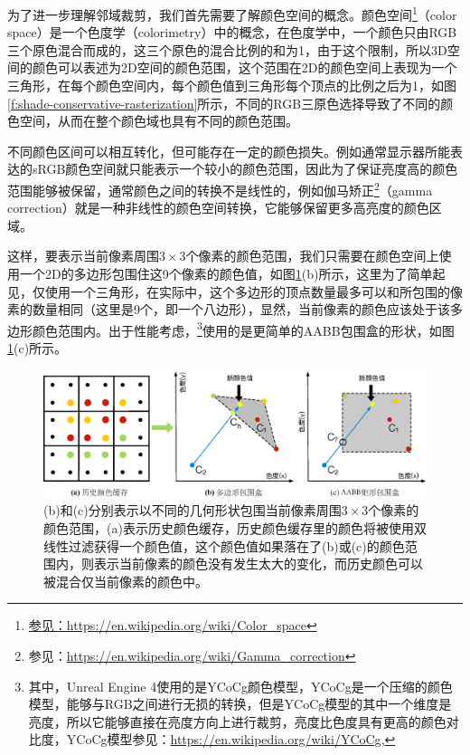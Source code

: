 为了进一步理解邻域裁剪，我们首先需要了解颜色空间的概念。颜色空间\footnote{\url{参见：https://en.wikipedia.org/wiki/Color_space}}（color space）是一个色度学（colorimetry）中的概念，在色度学中，一个颜色只由RGB三个原色混合而成的，这三个原色的混合比例的和为1，由于这个限制，所以3D空间的颜色可以表述为2D空间的颜色范围，这个范围在2D的颜色空间上表现为一个三角形，在每个颜色空间内，每个颜色值到三角形每个顶点的比例之后为1，如图\ref{f:shade-conservative-rasterization}所示，不同的RGB三原色选择导致了不同的颜色空间，从而在整个颜色域也具有不同的颜色范围。

不同颜色区间可以相互转化，但可能存在一定的颜色损失。例如通常显示器所能表达的sRGB颜色空间就只能表示一个较小的颜色范围，因此为了保证亮度高的颜色范围能够被保留，通常颜色之间的转换不是线性的，例如伽马矫正\footnote{参见：\url{https://en.wikipedia.org/wiki/Gamma_correction}}（gamma correction）就是一种非线性的颜色空间转换，它能够保留更多高亮度的颜色区域。

这样，要表示当前像素周围$3\times 3$个像素的颜色范围，我们只需要在颜色空间上使用一个2D的多边形包围住这9个像素的颜色值，如图\ref{f:shade-clamping}(b)所示，这里为了简单起见，仅使用一个三角形，在实际中，这个多边形的顶点数量最多可以和所包围的像素的数量相同（这里是9个，即一个八边形），显然，当前像素的颜色应该处于该多边形颜色范围内。出于性能考虑，\cite{a:AnExcursioninTemporalSupersampling,a:RealtimeglobalilluminationandreflectionsinDust514,a:TemporalAntialiasingInUncharted4}\footnote{其中，Unreal Engine 4使用的是YCoCg颜色模型，YCoCg是一个压缩的颜色模型，能够与RGB之间进行无损的转换，但是YCoCg模型的其中一个维度是亮度，所以它能够直接在亮度方向上进行裁剪，亮度比色度具有更高的颜色对比度，YCoCg模型参见：\url{https://en.wikipedia.org/wiki/YCoCg},}使用的是更简单的AABB包围盒的形状，如图\ref{f:shade-clamping}(c)所示。

\begin{figure}
\begin{fullwidth}
	\includegraphics[width=\thewidth]{figures/shade/clamping}
	\caption{(b)和(c)分别表示以不同的几何形状包围当前像素周围$3\times 3$个像素的颜色范围，(a)表示历史颜色缓存，历史颜色缓存里的颜色将被使用双线性过滤获得一个颜色值，这个颜色值如果落在了(b)或(c)的颜色范围内，则表示当前像素的颜色没有发生太大的变化，而历史颜色可以被混合仅当前像素的颜色中。}
	\label{f:shade-clamping}
\end{fullwidth}
\end{figure}

